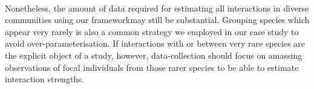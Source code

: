 \documentclass[a4,12pt]{article}
\begin{document}
\begin{refsection}


    \paragraph{}
    Nonetheless, the amount of data required for estimating all interactions in diverse communities using our frameworkmay still be substantial. Grouping species which appear very rarely is also a common strategy we employed in our case study to avoid over-parameterisation. If interactions with or between very rare species are the explicit object of a study, however, data-collection should focus on amassing observations of focal individuals from those rarer species to be able to estimate  interaction strengths.  


\end{refsection}
\end{document}
